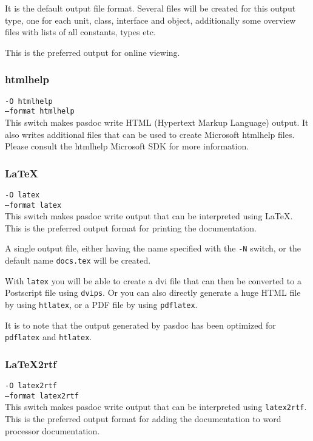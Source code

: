\documentclass[11pt]{article}
\begin{document}
It is the default output file format. Several files will be created for 
this output type, one for each unit, class, interface and object, 
additionally some overview files with lists of all constants, types etc.

This is the preferred output for online viewing.

\subsubsection{htmlhelp}

{\tt -O htmlhelp}\\
{\tt --format htmlhelp}\\

This switch makes pasdoc write HTML (Hypertext Markup Language) output.
It also writes additional files that can be used to create Microsoft
htmlhelp files. Please consult the htmlhelp Microsoft SDK for more 
information.

\subsubsection{\LaTeX}

{\tt -O latex}\\
{\tt --format latex}\\

This switch makes pasdoc write output that can be interpreted using
\LaTeX. This is the preferred output format for printing the 
documentation.

A single output file, either having the name specified with
the {\tt -N} switch, or the default name {\tt docs.tex} will
be created. 

With {\tt latex} you will be able to create a dvi file
that can then be converted to a Postscript file using 
{\tt dvips}. Or you can also directly generate a huge
HTML file by using {\tt htlatex}, or a PDF file
by using {\tt pdflatex}.

It is to note that the output generated by pasdoc has been 
optimized for {\tt pdflatex} and {\tt htlatex}.

\subsubsection{LaTeX2rtf}

{\tt -O latex2rtf}\\
{\tt --format latex2rtf}\\

This switch makes pasdoc write output that can be interpreted using
{\tt latex2rtf}. This is the preferred output format for adding
the documentation to word processor documentation.
\end{document}
